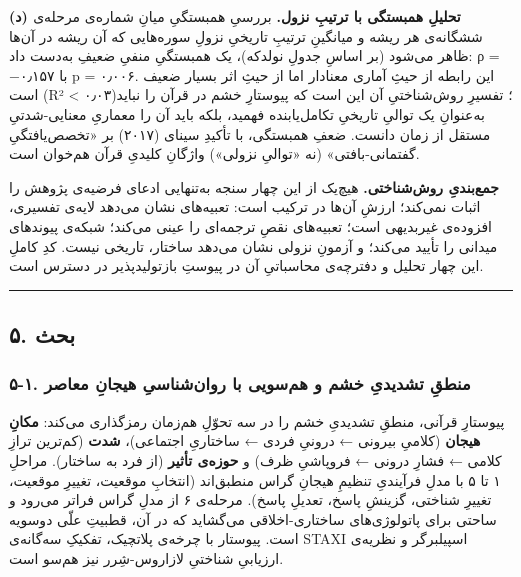 \begin{RTL}
\begin{otherlanguage}{persian}
\textbf{(د) تحلیلِ همبستگی با ترتیبِ نزول.} بررسیِ همبستگیِ میانِ شماره‌ی
مرحله‌ی ششگانه‌ی هر ریشه و میانگینِ ترتیبِ تاریخیِ نزولِ سوره‌هایی که آن ریشه
در آن‌ها ظاهر می‌شود (بر اساسِ جدولِ نولدکه)، یک همبستگیِ منفیِ ضعیفِ
 به‌دست داد: ρ = −۰٫۱۵۷ با p = ۰٫۰۰۶. این رابطه از حیثِ آماری
معنادار اما از حیثِ اثر بسیار ضعیف است (R² \textless{} ۰٫۰۳)؛ تفسیرِ
روش‌شناختیِ آن این است که پیوستارِ خشم در قرآن را نباید به‌عنوانِ یک توالیِ
تاریخیِ تکامل‌یابنده فهمید، بلکه باید آن را معماریِ معنایی-شدتیِ مستقل از
زمان دانست. ضعفِ همبستگی، با تأکیدِ سینای (۲۰۱۷) بر «تخصص‌یافتگیِ
گفتمانی-بافتی» (نه «توالیِ نزولی») واژگانِ کلیدیِ قرآن هم‌خوان است.

\textbf{جمع‌بندیِ روش‌شناختی.} هیچ‌یک از این چهار سنجه به‌تنهایی ادعای فرضیه‌ی
پژوهش را اثبات نمی‌کند؛ ارزشِ آن‌ها در ترکیب است: تعبیه‌های 
نشان می‌دهد لایه‌ی تفسیری، افزوده‌ی غیربدیهی است؛ تعبیه‌های  نقصِ
ترجمه‌ای را عینی می‌کند؛ شبکه‌ی  پیوندهای میدانی را تأیید می‌کند؛ و
آزمونِ نزولی نشان می‌دهد ساختار، تاریخی نیست. کدِ کاملِ این چهار تحلیل و
دفترچه‌ی محاسباتیِ آن در پیوستِ بازتولیدپذیر در دسترس است.

\begin{center}\rule{0.5\linewidth}{0.5pt}\end{center}

\subsection{۵. بحث}\label{ux628ux62dux62b}

\subsubsection{۵-۱. منطقِ تشدیدیِ خشم و هم‌سویی با روان‌شناسیِ هیجانِ
معاصر}\label{ux645ux646ux637ux642-ux62aux634ux62fux6ccux62fux6cc-ux62eux634ux645-ux648-ux647ux645ux633ux648ux6ccux6cc-ux628ux627-ux631ux648ux627ux646ux634ux646ux627ux633ux6cc-ux647ux6ccux62cux627ux646-ux645ux639ux627ux635ux631}

پیوستارِ قرآنی، منطقِ تشدیدیِ خشم را در سه تحوّلِ هم‌زمان رمزگذاری می‌کند:
\textbf{مکانِ هیجان} (کلامیِ بیرونی ← درونیِ فردی ← ساختاریِ اجتماعی)،
\textbf{شدت} (کم‌ترین ترازِ کلامی ← فشارِ درونی ← فروپاشیِ ظرف) و
\textbf{حوزه‌ی تأثیر} (از فرد به ساختار). مراحلِ ۱ تا ۵ با مدلِ فرآیندیِ
تنظیمِ هیجانِ گراس منطبق‌اند (انتخابِ موقعیت، تغییرِ موقعیت، تغییرِ شناختی،
گزینشِ پاسخ، تعدیلِ پاسخ). مرحله‌ی ۶ از مدلِ گراس فراتر می‌رود و ساحتی برای
پاتولوژی‌های ساختاری-اخلاقی می‌گشاید که در آن، قطبیتِ علّی دوسویه است.
پیوستار با چرخه‌ی پلاتچیک، تفکیکِ سه‌گانه‌ی STAXI اسپیلبرگر و نظریه‌ی ارزیابیِ
شناختیِ لازاروس-شِرر نیز هم‌سو است.


\end{otherlanguage}
\end{RTL}
